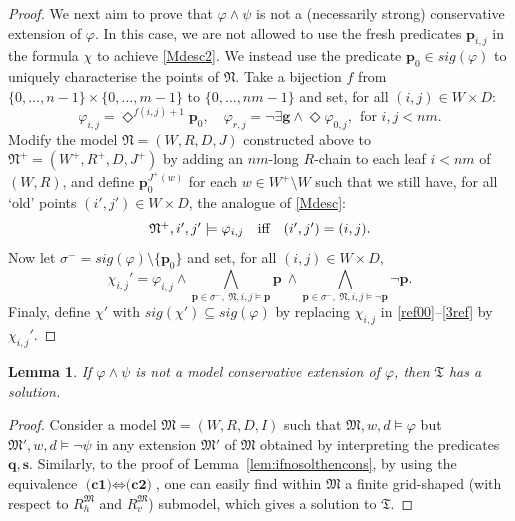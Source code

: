 \documentclass[10pt,a4paper]{amsart}
\theoremstyle{plain}
\newtheorem{lem}[thm]{Lemma}
\theoremstyle{definition}
\newcommand{\sig}{\mathit{sig}}
\newcommand{\tiling}{\mathfrak T}
\newcommand{\ssvar}{\fform{s}}
\newcommand{\fform}[1]{\boldsymbol{#1}}
\newcommand{\pvar}{\fform{p}}
\newcommand{\qvar}{\fform{q}}
\newcommand{\gvar}{\fform{g}}
\newcommand{\Dv}{\exists}
\newcommand{\Dh}{\Diamond}
\begin{document}
\begin{proof}
		We next aim to prove that $\varphi\land\psi$ is not a (necessarily strong) conservative extension of $\varphi$. In this case, we are not allowed to use the fresh predicates 
		$\pvar_{i,j}$ in the formula $\chi$ to achieve \eqref{Mdesc2}.
		We instead  use the predicate $\pvar_0\in\sig(\varphi)$ to uniquely characterise the points of $\mathfrak N$.
		Take a bijection $f$ from $\{0,\ldots,n-1\}\times \{0,\ldots,m-1\}$ to $\{0,\ldots,nm-1\}$ and 
		set, for all $(i,j)\in W\times D$:
		\[ 
		\varphi_{i,j}=\Dh^{f(i,j)+1}\pvar_0,\quad \varphi_{r,j}=\neg \Dv \gvar \wedge \Dh \varphi_{0,j},\ \ 
		\mbox{for $i,j<nm$.}
		\]
		Modify the model $\mathfrak N=(W,R,D,J)$ constructed above to $\mathfrak N^+=(W^+,R^+,D,J^+)$ by adding an $nm$-long $R$-chain to each
		leaf $i<nm$ of $(W,R)$, and define $\pvar_0^{J^+(w)}$ for each $w\in W^+\setminus W$ such that we still have, for all `old' points $(i',j')\in W\times D$, the analogue of \eqref{Mdesc}:
			\[
			\mbox{$\mathfrak N^+,i',j'\models \varphi_{i,j}$\quad iff\quad $(i',j')=(i,j)$.}
		\]
		Now let $\sigma^-=\sig(\varphi)\setminus\{\pvar_0\}$ and set, for all $(i,j)\in W\times D$,
			\[
			\chi_{i,j}' = \varphi_{i,j}\land\bigwedge_{\pvar\in\sigma^-,\ \mathfrak N,i,j\models \pvar}\pvar\  \land
			\bigwedge_{\pvar\in\sigma^-,\ \mathfrak N,i,j\models \neg\pvar}\neg\pvar.
		\]
		Finaly, define $\chi'$ with $\sig(\chi')\subseteq\sig(\varphi)$ by replacing $\chi_{i,j}$ in \eqref{ref00}--\eqref{3ref} by $\chi_{i,j}'$.	
	\end{proof}
	
	\begin{lem}\label{lem:ifnosolthencons2}
		If $\varphi \wedge \psi$ is not a model conservative extension of $\varphi$, then $\tiling$ has a solution.
	\end{lem}
	\begin{proof}
		Consider a model $\mathfrak{M}=(W,R,D,I)$ such that $\mathfrak{M},w,d\models \varphi$ but 
		$\mathfrak{M}',w,d\models \neg\psi$
		in any extension $\mathfrak M'$ of $\mathfrak{M}$ obtained by interpreting the predicates $\qvar,\ssvar$.
		Similarly, to the proof of Lemma~\ref{lem:ifnosolthencons}, 
		by using the equivalence $\textbf{(c1)} \Leftrightarrow \textbf{(c2)}$, one can easily find within $\mathfrak{M}$ a finite grid-shaped (with respect to $R_{h}^\mathfrak M$ and 
		$R_{v}^\mathfrak M$) submodel, which gives a solution to $\tiling$.
	\end{proof}
	
\end{document}

